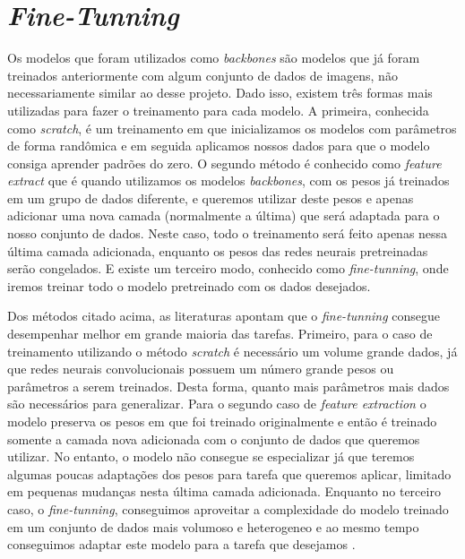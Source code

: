 \documentclass[ %
	msc, %
	portugues %
]{../ppgccufmg}
\begin{document}
    \section{\textit{Fine-Tunning}}\label{sec:fineextraction}

    Os modelos que foram utilizados como \textit{backbones} são modelos que já foram treinados
    anteriormente com algum conjunto de dados de imagens, não necessariamente similar ao desse
    projeto.
    Dado isso,  existem três formas mais utilizadas para fazer o treinamento para cada modelo. A
    primeira, conhecida como \textit{scratch}, é um treinamento em que inicializamos os modelos com
    parâmetros de forma randômica e em seguida aplicamos nossos dados para que o modelo consiga aprender padrões
    do zero. O segundo método é conhecido como \textit{feature extract} que é quando
    utilizamos os modelos \textit{backbones}, com os pesos já treinados em um grupo de dados
    diferente, e queremos utilizar deste pesos e apenas adicionar uma nova camada (normalmente a
    última) que será adaptada
    para o nosso conjunto de dados. Neste caso, todo o treinamento será feito apenas nessa última
    camada adicionada, enquanto os pesos das redes neurais pretreinadas serão congelados. E existe
    um terceiro modo, conhecido como \textit{fine-tunning}, onde iremos treinar todo o modelo
    pretreinado com os dados desejados.

    Dos métodos citado acima, as literaturas apontam que o \textit{fine-tunning} consegue desempenhar
    melhor em grande maioria das tarefas. Primeiro, para o caso de treinamento utilizando o
    método \textit{scratch} é necessário um volume grande dados, já que redes neurais convolucionais
    possuem um número grande pesos ou parâmetros a serem treinados. Desta forma, quanto mais
    parâmetros mais dados são necessários para generalizar. Para o segundo caso de \textit{feature
    extraction} o modelo preserva os pesos em que foi treinado originalmente e então é treinado
    somente a camada nova adicionada com o conjunto de dados que queremos utilizar.
    No entanto, o modelo não consegue se especializar já que teremos algumas poucas adaptações dos pesos para
    tarefa que queremos aplicar, limitado em pequenas mudanças nesta última camada adicionada.
    Enquanto no terceiro caso, o \textit{fine-tunning}, conseguimos aproveitar a complexidade do
    modelo treinado em um conjunto de dados mais volumoso e heterogeneo e ao mesmo tempo conseguimos
    adaptar este modelo para a tarefa que desejamos \citep{DBLP:journals/corr/LiH16e,
    Girshick2014RichFH, Azizpour2016FactorsOT, Agrawal2014AnalyzingTP, Yosinski2014HowTA}.
\end{document}
